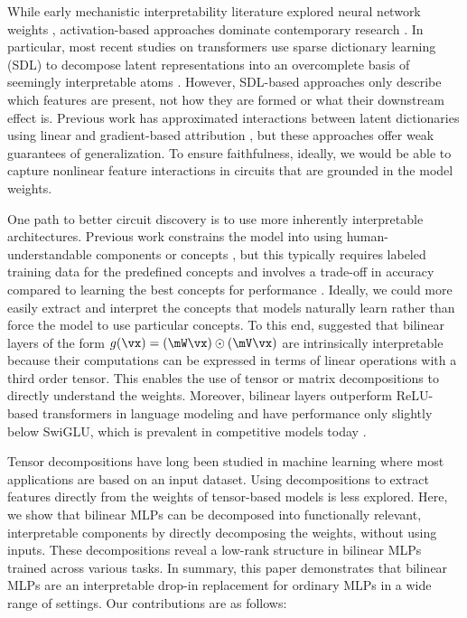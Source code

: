 \documentclass{article} %
\begin{document}
While early mechanistic interpretability literature explored neural network weights \citep{olah2017feature, olah_zoom_2020, voss2021visualizing, elhage_mathematical_2021}, activation-based approaches dominate contemporary research \citep{petsiuk2018riserandomizedinputsampling, ribeiro2016whyitrustyou, simonyan2014deepinside, Montavon_2018}.
In particular, most recent studies on transformers use sparse dictionary learning (SDL) to decompose latent representations into an overcomplete basis of seemingly interpretable atoms
\citep{cunningham_sparse_2024, bricken_monosemanticity_2023, marks2024sparse, dunefsky2024transcoders}.
However, SDL-based approaches only describe which features are present, not how they are formed or what their downstream effect is. 
Previous work has approximated interactions between latent dictionaries using linear and gradient-based attribution \citep{marks2024sparse, ge2024automatically}, but these approaches offer weak guarantees of generalization. To ensure faithfulness, ideally, we would be able to capture nonlinear feature interactions in circuits that are grounded in the model weights.

One path to better circuit discovery is to use more inherently interpretable architectures. Previous work constrains the model into using human-understandable components or concepts \citep{conceptbottleneck, chen2019lookslikethatdeep}, but this typically requires labeled training data for the predefined concepts and involves a trade-off in accuracy compared to learning the best concepts for performance \citep{henighan_superposition_2023}. Ideally, we could more easily extract and interpret the concepts that models naturally learn rather than force the model to use particular concepts. To this end, \citet{bilinear_note} suggested that bilinear layers \cite{lin2015bilinear, li2017factorized, chrysos2021deep} of the form $g(\vx) = (\mW\vx) \odot (\mV\vx)$ are intrinsically interpretable because their computations can be expressed in terms of linear operations with a third order tensor. This enables the use of tensor or matrix decompositions to directly understand the weights. Moreover, bilinear layers outperform ReLU-based transformers in language modeling \citep{shazeer2020glu} and have performance only slightly below SwiGLU, which is prevalent in competitive models today \citep{llama2}.

Tensor decompositions have long been studied in machine learning \citep{Cichocki_2015, Panagakis_2021, tensor_decomp_deep} where most applications are based on an input dataset. Using decompositions to extract features directly from the weights of tensor-based models is less explored. Here, we show that bilinear MLPs can be decomposed into functionally relevant, interpretable components by directly decomposing the weights, without using inputs. These decompositions reveal a low-rank structure in bilinear MLPs trained across various tasks. In summary, this paper demonstrates that bilinear MLPs are an interpretable drop-in replacement for ordinary MLPs in a wide range of settings. Our contributions are as follows:
\end{document}

